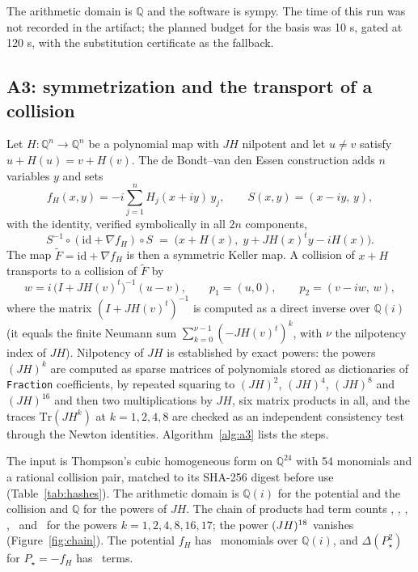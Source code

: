 \documentclass[11pt]{article}
\theoremstyle{remark}
\newcommand{\Q}{\mathbb{Q}}
\begin{document}
The arithmetic domain is $\Q$ and the software is sympy. The time of this run was not recorded in the artifact; the planned budget for the basis was 10 s, gated at 120 s, with the substitution certificate as the fallback.

\subsection{A3: symmetrization and the transport of a collision}\label{sec:a3}

Let $H:\Q^n\to\Q^n$ be a polynomial map with $JH$ nilpotent and let $u\ne v$ satisfy $u+H(u)=v+H(v)$. The de Bondt--van den Essen construction \cite[eq.~(3), p.~2202; proof of Theorem~1.1, p.~2203]{dBvdE2005} adds $n$ variables $y$ and sets
\begin{equation}\label{eq:potential}
f_H(x,y)=-i\sum_{j=1}^{n}H_j(x+iy)\,y_j,\qquad S(x,y)=(x-iy,\,y),
\end{equation}
with the identity, verified symbolically in all $2n$ components,
\begin{equation}\label{eq:conj}
S^{-1}\circ(\mathrm{id}+\nabla f_H)\circ S\;=\;\big(x+H(x),\;y+JH(x)^{t}y-iH(x)\big).
\end{equation}
The map $\widetilde F=\mathrm{id}+\nabla f_H$ is then a symmetric Keller map. A collision of $x+H$ transports to a collision of $\widetilde F$ by
\begin{equation}\label{eq:collision}
w=i\,\big(I+JH(v)^{t}\big)^{-1}(u-v),\qquad p_1=(u,0),\qquad p_2=(v-iw,\,w),
\end{equation}
where the matrix $(I+JH(v)^t)^{-1}$ is computed as a direct inverse over $\Q(i)$ (it equals the finite Neumann sum $\sum_{k=0}^{\nu-1}(-JH(v)^t)^k$, with $\nu$ the nilpotency index of $JH$). Nilpotency of $JH$ is established by exact powers: the powers $(JH)^k$ are computed as sparse matrices of polynomials stored as dictionaries of \texttt{Fraction} coefficients, by repeated squaring to $(JH)^2$, $(JH)^4$, $(JH)^8$ and $(JH)^{16}$ and then two multiplications by $JH$, six matrix products in all, and the traces $\mathrm{Tr}(JH^k)$ at $k=1,2,4,8$ are checked as an independent consistency test through the Newton identities. Algorithm~\ref{alg:a3} lists the steps.

The input is Thompson's cubic homogeneous form on $\Q^{24}$ with 54 monomials and a rational collision pair, matched to its SHA-256 digest before use (Table~\ref{tab:hashes}). The arithmetic domain is $\Q(i)$ for the potential and the collision and $\Q$ for the powers of $JH$. The chain of products had term counts \njhone, \njhtwo, \njhfour, \njheight, \njhsixteen\ and \njhseventeen\ for the powers $k=1,2,4,8,16,17$; the power $(JH)^{18}$ vanishes (Figure~\ref{fig:chain}). The potential $f_H$ has \npotentialmon\ monomials over $\Q(i)$, and $\Delta(P_\star^2)$ for $P_\star=-f_H$ has \ndeltaterms\ terms.
\end{document}
